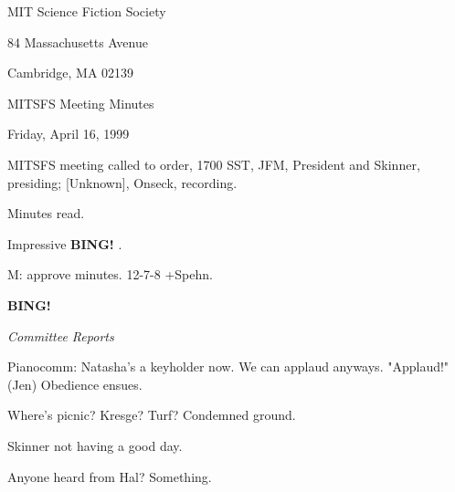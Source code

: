 \documentclass[12pt]{article}
\newcommand{\bing}{{\bf BING!} }
\newcommand{\goto}[1]{\bing \vskip 12pt \centerline{{\em{#1}}}}
\begin{document}
\begin{center}

MIT Science Fiction Society 

84 Massachusetts Avenue

Cambridge, MA 02139

\vspace{12pt}

MITSFS Meeting Minutes 

Friday, April 16, 1999

\end{center}
 
\vspace{18pt}

\setlength{\parskip}{6pt}

\noindent
MITSFS meeting called to order, 1700 SST,
JFM, President and Skinner, presiding; [Unknown], Onseck, recording.

Minutes read.

Impressive \bing.

M: approve minutes. 12-7-8 +Spehn.

\goto{Committee Reports}

Pianocomm: Natasha's a keyholder now. We can applaud anyways. "Applaud!" (Jen) Obedience ensues.

Where's picnic? Kresge? Turf? Condemned ground.

Skinner not having a good day.

Anyone heard from Hal? Something.
\end{document}
